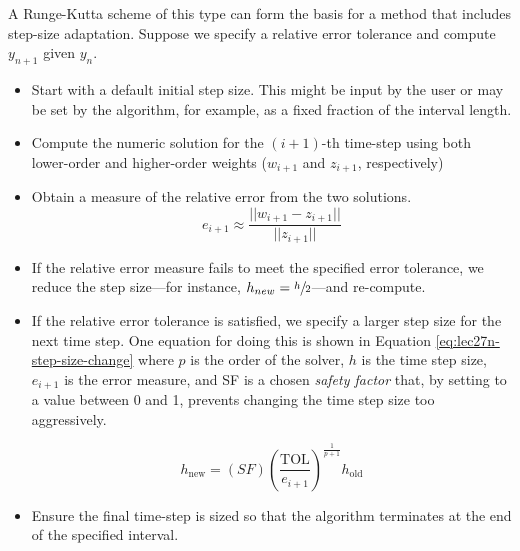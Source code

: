 A Runge-Kutta scheme of this type can form the basis for a method that includes step-size adaptation.  Suppose we specify a relative error tolerance and compute $y_{n+1}$ given $y_n$.  
\begin{itemize}
\item Start with a default initial step size.  This might be input by the user or may be set by the algorithm, for example, as a fixed fraction of the interval length. 
\item Compute the numeric solution for the $(i+1)$-th time-step using both lower-order and higher-order weights ($w_{i+1}$ and $z_{i+1}$, respectively)
\item Obtain a measure of the relative error from the two solutions.
\begin{equation*}
e_{i+1} \approx \frac{||w_{i+1}-z_{i+1}||}{||z_{i+1}||}
\end{equation*}
\item If the relative error measure fails to meet the specified error tolerance, we reduce the step size---for instance, $h_{new} = \sfrac{h}{2}$---and re-compute.
\item If the relative error tolerance is satisfied, we specify a larger step size for the next time step. One equation for doing this is shown in Equation \ref{eq:lec27n-step-size-change} where $p$ is the order of the solver, $h$ is the time step size, $e_{i+1}$ is the error measure, and SF is a chosen \emph{safety factor} that, by setting to a value between 0 and 1, prevents changing the time step size too aggressively.\cite{sauer2011numerical}

\begin{equation}
h_{\text{new}}=(SF)\left(\frac{\text{TOL}}{e_{i+1}}\right)^{\frac{1}{p+1}}h_{\text{old}}
\label{eq:lec27n-step-size-change}
\end{equation}

\item Ensure the final time-step is sized so that the algorithm terminates at the end of the specified interval.

\end{itemize}

